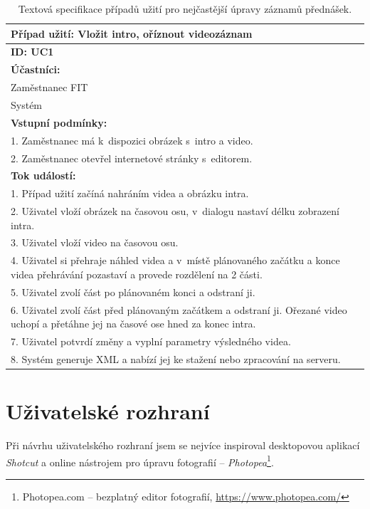 \begin{table}[h]
    \centering
    \begin{tabular}{|p{14cm}|}
        \hline
        Případ užití: Vložit intro, oříznout videozáznam\\ \hline
        \textbf{ID: UC1}\\ \hline
        \textbf{Účastníci:}\\
        Zaměstnanec FIT\\
        Systém\\ \hline
        \textbf{Vstupní podmínky:}\\
        1. Zaměstnanec má k~dispozici obrázek s~intro a video.\\
        2. Zaměstnanec otevřel internetové stránky s~editorem.\\ \hline
        \textbf{Tok událostí:}\\
        1. Případ užití začíná nahráním videa a obrázku intra.\\
        2. Uživatel vloží obrázek na časovou osu, v~dialogu nastaví délku zobrazení intra.\\
        3. Uživatel vloží video na časovou osu.\\
        4. Uživatel si přehraje náhled videa a v~místě plánovaného začátku a konce videa přehrávání pozastaví a provede rozdělení na 2 části.\\
        5. Uživatel zvolí část po plánovaném konci a odstraní ji.\\
        6. Uživatel zvolí část před plánovaným začátkem a odstraní ji. Ořezané video uchopí a přetáhne jej na časové ose hned za konec intra.\\
        7. Uživatel potvrdí změny a vyplní parametry výsledného videa.\\
        8. Systém generuje XML a nabízí jej ke stažení nebo zpracování na serveru.\\
        \hline
    \end{tabular}
    \caption{Textová specifikace případů užití pro nejčastější úpravy záznamů přednášek.}
    \label{tab:uc1}
\end{table}

\section{Uživatelské rozhraní}
Při návrhu uživatelského rozhraní jsem se nejvíce inspiroval desktopovou aplikací \textit{Shotcut} a online nástrojem pro úpravu fotografií -- \textit{Photopea}\footnote{Photopea.com -- bezplatný editor fotografií, \url{https://www.photopea.com/}}.

